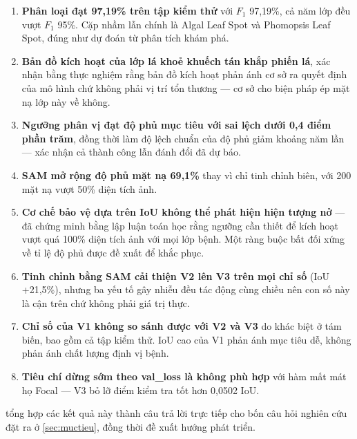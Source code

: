 \begin{enumerate}
    \item \textbf{Phân loại đạt 97,19\% trên tập kiểm thử} với $F_1$ 97,19\%, cả
          năm lớp đều vượt $F_1$ 95\%. Cặp nhầm lẫn chính là Algal Leaf Spot và
          Phomopsis Leaf Spot, đúng như dự đoán từ phân tích khám phá.

    \item \textbf{Bản đồ kích hoạt của lớp lá khoẻ khuếch tán khắp phiến lá}, xác
          nhận bằng thực nghiệm rằng bản đồ kích hoạt phản ánh cơ sở ra quyết định
          của mô hình chứ không phải vị trí tổn thương --- cơ sở cho biện pháp ép
          mặt nạ lớp này về không.

    \item \textbf{Ngưỡng phân vị đạt độ phủ mục tiêu với sai lệch dưới 0,4 điểm
          phần trăm}, đồng thời làm độ lệch chuẩn của độ phủ giảm khoảng năm lần
          --- xác nhận cả thành công lẫn đánh đổi đã dự báo.

    \item \textbf{SAM mở rộng độ phủ mặt nạ 69,1\%} thay vì chỉ tinh chỉnh biên,
          với 200 mặt nạ vượt 50\% diện tích ảnh.

    \item \textbf{Cơ chế bảo vệ dựa trên IoU không thể phát hiện hiện tượng nở} ---
          đã chứng minh bằng lập luận toán học rằng ngưỡng cần thiết để kích hoạt
          vượt quá 100\% diện tích ảnh với mọi lớp bệnh. Một ràng buộc bất đối xứng
          về tỉ lệ độ phủ được đề xuất để khắc phục.

    \item \textbf{Tinh chỉnh bằng SAM cải thiện V2 lên V3 trên mọi chỉ số}
          (IoU +21,5\%), nhưng ba yếu tố gây nhiễu đều tác động cùng chiều nên con
          số này là cận trên chứ không phải giá trị thực.

    \item \textbf{Chỉ số của V1 không so sánh được với V2 và V3} do khác biệt ở
          tám biến, bao gồm cả tập kiểm thử. IoU cao của V1 phản ánh mục tiêu dễ,
          không phản ánh chất lượng định vị bệnh.

    \item \textbf{Tiêu chí dừng sớm theo val\_loss là không phù hợp} với hàm mất
          mát họ Focal --- V3 bỏ lỡ điểm kiểm tra tốt hơn 0,0502 IoU.
\end{enumerate}

 tổng hợp các kết quả này thành câu trả lời trực tiếp cho bốn
câu hỏi nghiên cứu đặt ra ở \cref{sec:muctieu}, đồng thời đề xuất hướng phát triển.
